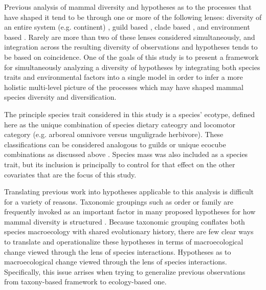 \documentclass[12pt,letterpaper]{article}
\begin{document}
Previous analysis of mammal diversity and hypotheses as to the processes that have shaped it tend to be through one or more of the following lenses: diversity of an entire system (e.g. continent) \citep{Alroy2000g,Alroy1996a,Figueirido2012,Liow2008}, guild based \citep{Janis2004,Janis2000,Jernvall2004,Janis1993c,Pires2015a,Janis2008a}, clade based \citep{Quental2013,Slater2015c,Silvestro2015b,Fraser2015a,Cantalapiedra2017}, and environment based \citep{Blois2009,Janis1993c,Janis1993b,Fraser2015a,Eronen2015,Badgley2013,Badgley2017}. Rarely are more than two of these lenses considered simultaneously, and integration across the resulting diversity of observations and hypotheses tends to be based on coincidence. One of the goals of this study is to present a framework for simultaneously analyzing a diversity of hypotheses by integrating both species traits and environmental factors into a single model in order to infer a more holistic multi-level picture of the processes which may have shaped mammal species diversity and diversification.

The principle species trait considered in this study is a species' ecotype, defined here as the unique combination of species dietary cateogry and locomotor category (e.g. arboreal omnivore versus unguligrade herbivore). These classifications can be considered analogous to guilds or unique ecocube combinations as discussed above \citep{Bush2007,Bambach2007,Bush2011}. Species mass was also included as a species trait, but its inclusion is principally to control for that effect on the other covariates that are the focus of this study.

Translating previous work into hypotheses applicable to this analysis is difficult for a variety of reasons. Taxonomic groupings such as order or family are frequently invoked as an important factor in many proposed hypotheses for how mammal diversity is structured \citep{Quental2013,Slater2015c,Janis1993c,Pires2015a,Janis2008a}. Because taxonomic grouping conflates both species macroecology with shared evolutionary history, there are few clear ways to translate and operationalize these hypotheses in terms of macroecological change viewed through the lens of species interactions. Hypotheses as to macroecological change viewed through the lens of species interactions. Specifically, this issue arrises when trying to generalize previous observations from taxony-based framework to ecology-based one.
\end{document}
